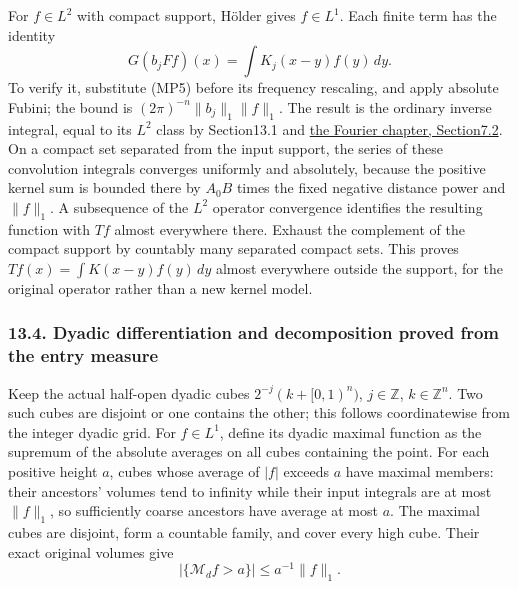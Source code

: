 \documentclass[
  11pt,
]{article}
\makeatletter
\let\ReaderOriginalAnchorStart\hyper@anchorstart
\let\ReaderOriginalAnchorEnd\hyper@anchorend
\let\ReaderPendingAliases\@empty
\def\ReaderArmAliases#1{\gdef\ReaderPendingAliases{#1}}
\def\hyper@anchorstart#1{\ReaderIfNativeAnchorTF{#1}{\ReaderPendingAliases\global\let\ReaderPendingAliases\@empty}{}\ReaderOriginalAnchorStart{#1}}
\makeatother
\begin{document}
For \(f\in L^2\) with compact support, Hölder gives \(f\in L^1\). Each
finite term has the identity \[
 G(b_jFf)(x)=\int K_j(x-y)f(y)\,dy .
                                                               \tag{MP11}
\] To verify it, substitute (MP5) before its frequency rescaling, and
apply absolute Fubini; the bound is \((2\pi)^{-n}\|b_j\|_1\|f\|_1\). The
result is the ordinary inverse integral, equal to its \(L^2\) class by
Section13.1 and \href{prerequisite-bridges.pdf}{the
Fourier chapter, Section7.2}. On a compact set separated from the input
support, the series of these convolution integrals converges uniformly
and absolutely, because the positive kernel sum is bounded there by
\(A_0B\) times the fixed negative distance power and \(\|f\|_1\). A
subsequence of the \(L^2\) operator convergence identifies the resulting
function with \(Tf\) almost everywhere there. Exhaust the complement of
the compact support by countably many separated compact sets. This
proves \(Tf(x)=\int K(x-y)f(y)\,dy\) almost everywhere outside the
support, for the original operator rather than a new kernel model.

\ReaderArmAliases{\ReaderOriginalAnchorStart{AN03-LCE-MULT-004}\ReaderOriginalAnchorEnd\begingroup\expandafter\def\csname @currentHref\endcsname{AN03-LCE-MULT-004}\label{AN03-LCE-MULT-004}\endgroup\ReaderOriginalAnchorStart{dyadic-differentiation-and-decomposition-proved-from-the-entry-measure}\ReaderOriginalAnchorEnd}
\subsubsection{13.4. Dyadic differentiation and decomposition proved
from the entry
measure}\label{dyadic-differentiation-and-decomposition-proved-from-the-entry-measure}

Keep the actual half-open dyadic cubes \(2^{-j}(k+[0,1)^n)\),
\(j\in\mathbb Z\), \(k\in\mathbb Z^n\). Two such cubes are disjoint or
one contains the other; this follows coordinatewise from the integer
dyadic grid. For \(f\in L^1\), define its dyadic maximal function as the
supremum of the absolute averages on all cubes containing the point. For
each positive height \(a\), cubes whose average of \(|f|\) exceeds \(a\)
have maximal members: their ancestors' volumes tend to infinity while
their input integrals are at most \(\|f\|_1\), so sufficiently coarse
ancestors have average at most \(a\). The maximal cubes are disjoint,
form a countable family, and cover every high cube. Their exact original
volumes give \[
 |\{\mathcal M_df>a\}|\leq a^{-1}\|f\|_1 .
                                                               \tag{MP12}
\]
\end{document}
